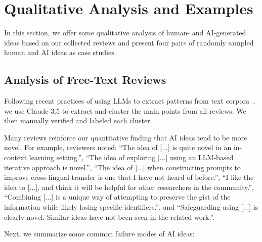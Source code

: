 \section{Qualitative Analysis and Examples}
\label{sec:analysis}

In this section, we offer some qualitative analysis of human- and AI-generated ideas based on our collected reviews and present four pairs of randomly sampled human and AI ideas as case studies.  

\subsection{Analysis of Free-Text Reviews}

Following recent practices of using LLMs to extract patterns from text corpora~\cite{Zhong2022DescribingDB,Zhong2023GoalDD}, we use Claude-3.5 to extract and cluster the main points from all reviews. We then manually verified and labeled each cluster. 

Many reviews reinforce our quantitative finding that AI ideas tend to be more novel. For example, reviewers noted: ``The idea of [...] is quite novel in an in-context learning setting.'', ``The idea of exploring [...] using an LLM-based iterative approach is novel.'', ``The idea of [...] when constructing prompts to improve cross-lingual transfer is one that I have not heard of before.'', ``I like the idea to [...], and think it will be helpful for other researchers in the community.'', ``Combining [...] is a unique way of attempting to preserve the gist of the information while likely losing specific identifiers.'', and ``Safeguarding using [...] is clearly novel. Similar ideas have not been seen in the related work.''. 

Next, we summarize some common failure modes of AI ideas:


